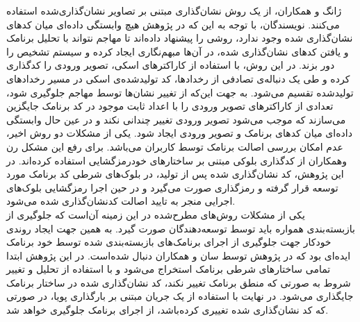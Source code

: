 ژانگ و همکاران، از یک روش نشان‌گذاری مبتنی بر تصاویر نشان‌گذاری‌شده استفاده می‌کنند. نویسندگان، با توجه به این که در پژوهش هیچ وابستگی داده‌ای میان کد‌های نشان‌گذاری شده وجود ندارد، روشی را پیشنهاد داده‌اند تا مهاجم نتواند با تحلیل برنامک‌ و یافتن کد‌های نشان‌گذاری شده، در آن‌ها مبهم‌نگاری ایجاد کرده و سیستم تشخیص را دور بزند. در این روش، با استفاده از کاراکتر‌های اسکی‌، تصویر ورودی را کدگذاری کرده و طی یک دنباله‌ی تصادفی از رخداد‌ها، کد تولید‌شده‌ی اسکی در مسیر رخداد‌های تولید‌شده تقسیم می‌شود. به جهت این‌که از تغییر نشان‌ها توسط مهاجم جلوگیری شود، تعدادی از کاراکتر‌های تصویر ورودی را با اعداد ثابت موجود در کد برنامک جایگزین می‌سازند که موجب می‌شود تصویر ورودی تغییر چندانی نکند و در عین حال وابستگی داده‌ای میان کد‌های برنامک و تصویر ورودی ایجاد شود. یکی از مشکلات دو روش اخیر، عدم امکان بررسی اصالت برنامک توسط کاربران می‌باشد. برای رفع این مشکل رن وهمکاران از کد‌گذاری بلوکی مبتنی بر ساختار‌های خود‌رمزگشایی‌ استفاده کرده‌اند. در این پژوهش، کد نشان‌گذاری شده پس از تولید، در بلوک‌های شرطی کد برنامک مورد توسعه قرار گرفته و رمز‌گذاری صورت می‌گیرد و در حین اجرا رمز‌گشایی بلوک‌های اجرایی منجر به تایید اصالت کدنشان‌گذاری شده می‌شود.\\
یکی از مشکلات روش‌های مطرح‌شده در این زمینه‌ آن‌است که جلوگیری از بازبسته‌بندی همواره باید توسط توسعه‌دهندگان صورت گیرد. به همین جهت ایجاد روندی خودکار جهت جلوگیری از اجرای برنامک‌های بازبسته‌بندی شده توسط خود برنامک ایده‌ای بود که در پژوهش توسط سان و همکاران دنبال  شده‌است. در این پژوهش ابتدا تمامی ساختار‌های شرطی‌ برنامک استخراج می‌شود و با استفاده از تحلیل و تغییر شروط به صورتی که منطق برنامک تغییر نکند، کد نشان‌گذاری شده در ساختار برنامک جایگذاری می‌شود. در نهایت با استفاده از یک جریان مبتنی بر بارگذاری پویا، در صورتی که کد نشان‌گذاری شده تغییری کرده‌باشد، از اجرای برنامک جلوگیری خواهد شد.
\\
